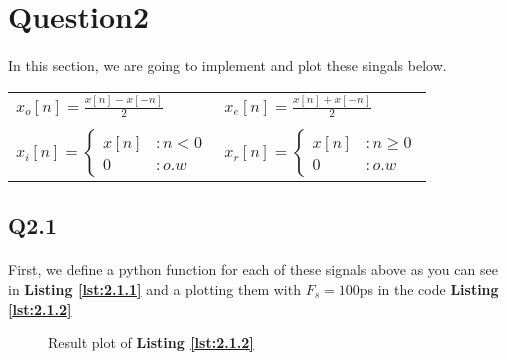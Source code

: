 \newpage
\section{Question2}
\paragraph{} In this section, we are going to implement
and plot these singals below.

\begin{center}
    \begin{tabular}{ p{5cm} p{5cm} }
     $x_o[n]=\frac{x[n]-x[-n]}{2}$ & $x_e[n]=\frac{x[n]+x[-n]}{2}$  \\ 
      & \\
     $
      x_i[n] = \begin{cases}
       x[n] &: n < 0\\
       0 &: o.w\end{cases}
     $ & $
      x_r[n] = \begin{cases}
       x[n] &: n\geq 0\\
       0 &: o.w\end{cases}
     $  \\  
     
    \end{tabular}

\end{center}
\subsection{Q2.1}
\paragraph{}First, we define a python function for
 each of these signals above as you can see in \textbf{Listing \ref{lst:2.1.1}}
and a plotting them with $F_s =100$ps in the code \textbf{Listing \ref{lst:2.1.2}}
 
\vspace{2ex}

\vspace{2ex}

\begin{figure}[H]
    \resizebox{\textwidth}{!}{}
    \caption{Result plot of \textbf{Listing \ref{lst:2.1.2}}}
    \label{fig:q2.1}
\end{figure}

